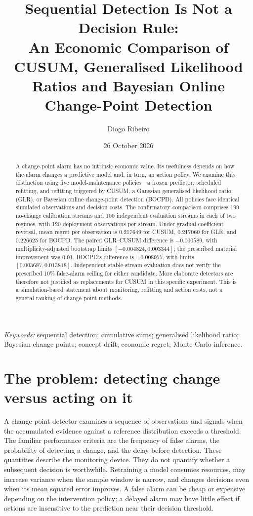 \documentclass[11pt,a4paper]{article}
\title{Sequential Detection Is Not a Decision Rule:\\An Economic Comparison of CUSUM, Generalised Likelihood Ratios and Bayesian Online Change-Point Detection}
\author{Diogo Ribeiro}
\date{26 October 2026}
\begin{document}
\maketitle
\begin{abstract}
A change-point alarm has no intrinsic economic value. Its usefulness depends on how the alarm changes a predictive model and, in turn, an action policy. We examine this distinction using five model-maintenance policies---a frozen predictor, scheduled refitting, and refitting triggered by CUSUM, a Gaussian generalised likelihood ratio (GLR), or Bayesian online change-point detection (BOCPD). All policies face identical simulated observations and decision costs. The confirmatory comparison comprises 199 no-change calibration streams and 100 independent evaluation streams in each of two regimes, with 120 deployment observations per stream. Under gradual coefficient reversal, mean regret per observation is 0.217649 for CUSUM, 0.217060 for GLR, and 0.226625 for BOCPD. The paired GLR--CUSUM difference is $-0.000589$, with multiplicity-adjusted bootstrap limits $[-0.004824,0.003344]$; the prescribed material improvement was 0.01. BOCPD's difference is $+0.008977$, with limits $[0.003687,0.013818]$. Independent stable-stream evaluation does not verify the prescribed 10\% false-alarm ceiling for either candidate. More elaborate detectors are therefore not justified as replacements for CUSUM in this specific experiment. This is a simulation-based statement about monitoring, refitting and action costs, not a general ranking of change-point methods.
\end{abstract}
\noindent\textit{Keywords:} sequential detection; cumulative sums; generalised likelihood ratio; Bayesian change points; concept drift; economic regret; Monte Carlo inference.

\section{The problem: detecting change versus acting on it}\label{sec:introduction}
A change-point detector examines a sequence of observations and signals when the accumulated evidence against a reference distribution exceeds a threshold. The familiar performance criteria are the frequency of false alarms, the probability of detecting a change, and the delay before detection. These quantities describe the monitoring device. They do not quantify whether a subsequent decision is worthwhile. Retraining a model consumes resources, may increase variance when the sample window is narrow, and changes decisions even when its mean squared error improves. A false alarm can be cheap or expensive depending on the intervention policy; a delayed alarm may have little effect if actions are insensitive to the prediction near their decision threshold.
\end{document}
